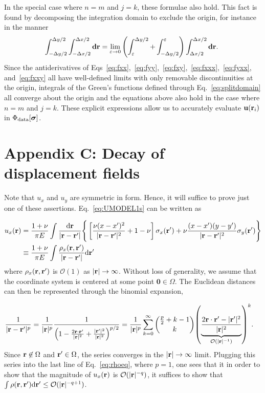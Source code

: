 \documentclass[aps,prl,reprint,twocolumn,groupedaddress,showpacs]{revtex4-1}
\newcommand{\bsigma}{{\boldsymbol\sigma}}
\def\d{{\bf d}}
\def\dd{\mbox{d}}
\def\r{{\bf r}}
\def\u{{\bf u}}
\begin{document}
\begin{widetext}
In the special case where $n=m$ and $j=k$, these formulae also
hold. This fact is found by decomposing the integration domain to
exclude the origin, for instance in the manner
\begin{equation}
\int_{ -\Delta y/2 }^{\Delta y/2 }\int_{- \Delta x/2 }^{\Delta x/2 } \d\r = \lim_{\varepsilon\to0} \left( \int_\varepsilon^{\Delta y/2}  +  \int_{-\Delta y/2}^\varepsilon   \right)\int_{\Delta x/2}^{\Delta x/2} \d\r.~\label{eq:splitdomain}
\end{equation}
Since the antiderivatives of
Eqs~\ref{eq:fxx},~\ref{eq:fyy},~\ref{eq:fxy},~\ref{eq:fxxx},~\ref{eq:fyxx},
and~\ref{eq:fxxy} all have well-defined limits with only removable
discontinuities at the origin, integrals of the Green's functions
defined through Eq.~\ref{eq:splitdomain} all converge about the origin
and the equations above also hold in the case where $n=m$ and $j=k$.
These explicit expressions allow us to accurately evaluate
$\u(\r_{i})$ in $\Phi_{\rm data}[\bsigma]$.

\section{Appendix C: Decay of displacement fields}

Note that $u_x$ and $u_y$ are symmetric in form. Hence, it will
suffice to prove just one of these assertions. Eq.~\ref{eq:UMODEL1s}
can be written as

\begin{align}
u_x(\r) & = \frac{1+\nu}{\pi E} \int \frac{\dd \r}{|\r-\r'|} 
\Bigg\{ \left[ \frac{\nu(x - x')^2}{|\r-\r'|^2} + 1-\nu \right]\sigma_{x}(\r') +\nu\frac{(x-x')(y-y')}{|\r-\r'|^2} \sigma_y(\r')  \Bigg\} \nonumber\\
& \equiv \frac{1+\nu}{\pi E}   \int\frac{\rho_x(\r,\r')}{|\r-\r'|} \dd \r'  \label{eq:rhoeq}
\end{align}
where $\rho_x(\r,\r')$ is $\mathcal{O}(1)$ as
$\vert\r\vert\to\infty$. Without loss of generality, we assume that
the coordinate system is centered at some point
$\mathbf{0}\in\Omega$. The Euclidean distances can then be represented
through the binomial expansion,

\begin{align}
\frac{1}{|\r-\r'|^p} &= \frac{1}{|\r|^p}\frac{1}{\left(1 - \frac{2\r\cdot\r'}{|\r|^2} 
+\frac{\vert\r'\vert^{2}}{\vert\r\vert^{2}}\right)^{p/2}} = \frac{1}{|\r|^p}\sum_{k=0}^\infty {{{p\over 2}+k-1}\choose{k}} 
{\left( \underbrace{ \frac{2\r\cdot\r' - |\r'|^2}{|\r|^2}}_{\mathcal{O}(|\r|^{-1})} \right)}^k.
\end{align}
% 
Since $\r\not\in\Omega$ and $\r'\in\Omega$, the series converges in
the $\vert \r\vert \to \infty$ limit. Plugging this series into the
last line of Eq.~\ref{eq:rhoeq}, where $p=1$, one sees that it in order to show
that the magnitude of $u_x(\r)$ is $\mathcal{O}(|\r|^{-q})$, it
suffices to show that $\int \rho(\r,\r')\dd\r' \leq
{\cal O}(|\r|^{-q+1})$.


\end{widetext}
\end{document}
